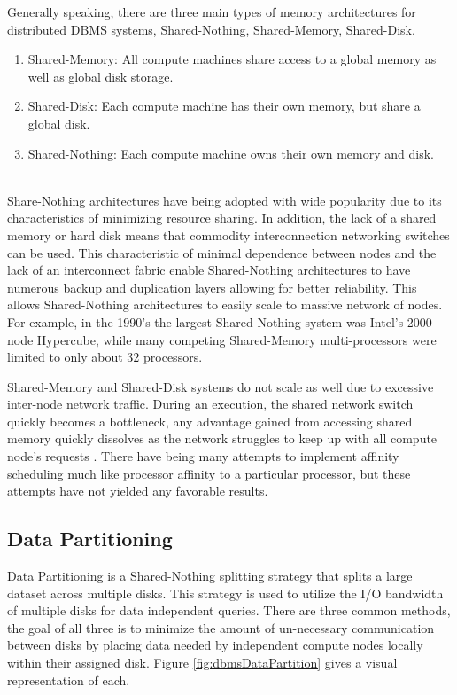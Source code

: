 \documentclass[10pt,twocolumn]{IEEEtran11}
\begin{document}
Generally speaking, there are three main types of memory 
architectures for distributed DBMS systems, Shared-Nothing, Shared-Memory, Shared-Disk.
\  \\
\begin{enumerate}
\setlength\itemsep{1em}
\item Shared-Memory: All compute machines share access to a global memory as well as global disk storage.  
\item Shared-Disk: Each compute machine has their own memory, but share a global disk.
\item Shared-Nothing: Each compute machine owns their own memory and disk. 
\end{enumerate}
\ \\
Share-Nothing architectures have being adopted with wide popularity due to its characteristics of minimizing resource sharing.  In addition, the lack of a shared memory or hard disk means that commodity interconnection networking switches can be used.  This characteristic of minimal dependence between nodes and the lack of an interconnect fabric enable Shared-Nothing architectures to have numerous backup and duplication layers allowing for better reliability.  This allows Shared-Nothing architectures to easily scale to massive network of nodes.  For example, in the 1990's the largest Shared-Nothing system was Intel's 2000 node Hypercube, while many competing Shared-Memory multi-processors were limited to only about 32 processors. 
\par
Shared-Memory and Shared-Disk systems do not scale as well due to excessive inter-node network traffic.  During an execution, the shared network switch quickly becomes a bottleneck, any advantage gained from accessing shared memory quickly dissolves as the network struggles to keep up with all compute node's requests \cite{thakkar1990performance}.  There have being many attempts to implement affinity scheduling much like processor affinity to a particular processor, but these attempts have not yielded any favorable results.  
\subsection{Data Partitioning}

Data Partitioning is a Shared-Nothing splitting strategy that splits a large dataset across multiple disks.  This strategy is used to utilize the I/O bandwidth of multiple disks for data independent queries.  There are three common methods, the goal of all three is to minimize the amount of un-necessary communication between disks by placing data needed by independent compute nodes locally within their assigned disk. Figure \ref{fig:dbmsDataPartition} gives a visual representation of each.
\end{document}
